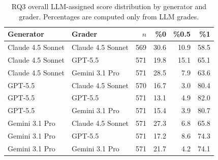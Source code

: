 \begin{table}[t]
\centering
\small
\caption{RQ3 overall LLM-assigned score distribution by generator and grader. Percentages are computed only from LLM grades.}
\label{tab:rq3-overall-score-distribution}
\begin{tabular}{llrrrr}
\toprule
Generator & Grader & $n$ & \%0 & \%0.5 & \%1 \\
\midrule
Claude 4.5 Sonnet & Claude 4.5 Sonnet & 569 & 30.6 & 10.9 & 58.5 \\
Claude 4.5 Sonnet & GPT-5.5 & 571 & 19.8 & 15.1 & 65.1 \\
Claude 4.5 Sonnet & Gemini 3.1 Pro & 571 & 28.5 & 7.9 & 63.6 \\
GPT-5.5 & Claude 4.5 Sonnet & 570 & 16.7 & 3.0 & 80.4 \\
GPT-5.5 & GPT-5.5 & 571 & 13.1 & 4.9 & 82.0 \\
GPT-5.5 & Gemini 3.1 Pro & 571 & 15.4 & 3.9 & 80.7 \\
Gemini 3.1 Pro & Claude 4.5 Sonnet & 571 & 27.3 & 6.8 & 65.8 \\
Gemini 3.1 Pro & GPT-5.5 & 571 & 17.2 & 8.6 & 74.3 \\
Gemini 3.1 Pro & Gemini 3.1 Pro & 571 & 21.7 & 4.2 & 74.1 \\
\bottomrule
\end{tabular}
\end{table}
